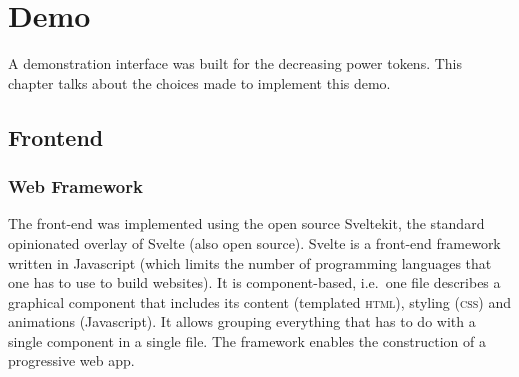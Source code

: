 \chapter{Demo}
\label{sec:demo}

A demonstration interface was built for the decreasing power tokens.
This chapter talks about the choices made to implement this demo.

\section{Frontend}

\subsection{Web Framework}

The front-end was implemented using the open source Sveltekit, the standard opinionated overlay of Svelte (also open source).
Svelte is a front-end framework written in Javascript (which limits the number of programming languages that one has to use to build websites).
It is component-based, i.e.\ one file describes a graphical component that includes its content (templated \textsc{html}), styling (\textsc{css}) and animations (Javascript).
It allows grouping everything that has to do with a single component in a single file.
The framework enables the construction of a progressive web app.

